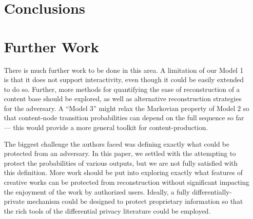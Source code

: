 \documentclass[preprint2]{aastex}
\begin{document}
\section{Conclusions}

\section{Further Work}

There is much further work to be done in this area. A limitation of our Model 1 is that it does not support interactivity, even though it could be easily extended to do so. Further, more methods for quantifying the ease of reconstruction of a content base should be explored, as well as alternative reconstruction strategies for the adversary. A ``Model 3'' might relax the Markovian property of Model 2 so that content-node transition probabilities can depend on the full sequence so far --- this would provide a more general toolkit for content-production.

The biggest challenge the authors faced was defining exactly what could be protected from an adversary. In this paper, we settled with the attempting to protect the probabilities of various outputs, but we are not fully satisfied with this definition. More work should be put into exploring exactly what features of creative works can be protected from reconstruction without significant impacting the enjoyment of the work by authorized users. Ideally, a fully differentially-private mechanism could be designed to protect proprietary information so that the rich tools of the differential privacy literature could be employed.

\end{document}
